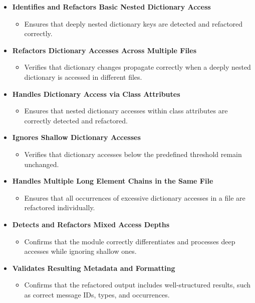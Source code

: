 \documentclass[12pt, titlepage]{article}
\begin{document}
\begin{itemize}
    \item \textbf{Identifies and Refactors Basic Nested Dictionary Access}
    \begin{itemize}
        \item Ensures that deeply nested dictionary keys are detected and refactored correctly.
    \end{itemize}

    \item \textbf{Refactors Dictionary Accesses Across Multiple Files}
    \begin{itemize}
        \item Verifies that dictionary changes propagate correctly when a deeply nested dictionary is accessed in different files.
    \end{itemize}

    \item \textbf{Handles Dictionary Access via Class Attributes}
    \begin{itemize}
        \item Ensures that nested dictionary accesses within class attributes are correctly detected and refactored.
    \end{itemize}

    \item \textbf{Ignores Shallow Dictionary Accesses}
    \begin{itemize}
        \item Verifies that dictionary accesses below the predefined threshold remain unchanged.
    \end{itemize}

    \item \textbf{Handles Multiple Long Element Chains in the Same File}
    \begin{itemize}
        \item Ensures that all occurrences of excessive dictionary accesses in a file are refactored individually.
    \end{itemize}

    \item \textbf{Detects and Refactors Mixed Access Depths}
    \begin{itemize}
        \item Confirms that the module correctly differentiates and processes deep accesses while ignoring shallow ones.
    \end{itemize}

    \item \textbf{Validates Resulting Metadata and Formatting}
    \begin{itemize}
        \item Confirms that the refactored output includes well-structured results, such as correct message IDs, types, and occurrences.
    \end{itemize}
\end{itemize}
\end{document}
